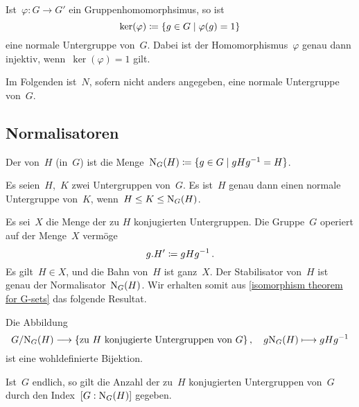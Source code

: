 \begin{example}[Kerne]
  Ist~$\varphi \colon G \to G'$ ein Gruppenhomomorphsimus, so ist
  \[
    \ker(\varphi)
    \defined
    \{
      g \in G
    \suchthat
      \varphi(g) = 1
    \}
  \]
  eine normale Untergruppe von~$G$.
  Dabei ist der Homomorphismus~$\varphi$ genau dann injektiv, wenn~$\ker(\varphi) = 1$ gilt.
\end{example}

\begin{convention}
  Im Folgenden ist~$N$, sofern nicht anders angegeben, eine normale Untergruppe von~$G$.
\end{convention}




\subsection{Normalisatoren}

\begin{definition}
  Der  von~$H$ (in~$G$) ist die Menge~$\normalizer_G(H) \defined \{ g \in G \suchthat g H g^{-1} = H \}$.
\end{definition}

\begin{proposition}
  Es seien~$H$,~$K$ zwei Untergruppen von~$G$.
  Es ist~$H$ genau dann einen normale Untergruppe von~$K$, wenn~$H \leq K \leq \operatorname{N}_G(H)$.
\end{proposition}

\begin{corollary}
  
\end{corollary}

Es sei~$X$ die Menge der zu $H$ konjugierten Untergruppen.
Die Gruppe~$G$ operiert auf der Menge~$X$ vermöge
\[
  g.H' \coloneqq g H g^{-1} \,.
\]
Es gilt~$H \in X$, und die Bahn von~$H$ ist ganz~$X$.
Der Stabilisator von~$H$ ist genau der Normalisator~$\operatorname{N}_G(H)$.
Wir erhalten somit aus \cref{isomorphism theorem for G-sets} das folgende Resultat.

\begin{corollary}
  Die Abbildung
  \[
    G / {\normalizer_G(H)}
    \to
    \{
      \text{zu~$H$ konjugierte Untergruppen von~$G$}
    \} \,,
    \quad
    g {\normalizer_G(H)}
    \mapsto
    g H g^{-1}
  \]
  ist eine wohldefinierte Bijektion.
\end{corollary}

\begin{corollary}
  Ist~$G$ endlich, so gilt die Anzahl der zu~$H$ konjugierten Untergruppen von~$G$ durch den Index~$[G : \operatorname{N}_G(H)]$ gegeben.
\end{corollary}





